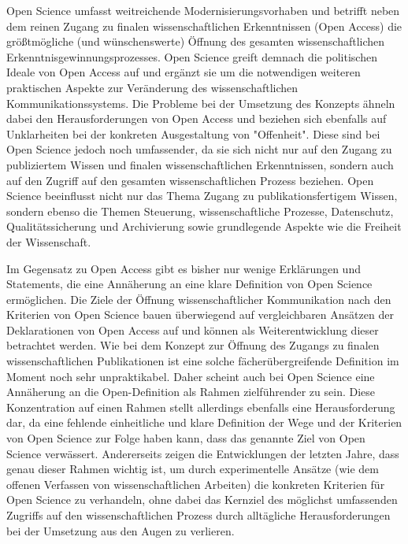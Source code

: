 Open Science umfasst weitreichende Modernisierungsvorhaben und betrifft neben dem reinen Zugang zu finalen wissenschaftlichen Erkenntnissen (Open Access) die größtmögliche (und wünschenswerte) Öffnung des gesamten wissenschaftlichen Erkenntnisgewinnungsprozesses. Open Science greift demnach die politischen Ideale von Open Access auf und ergänzt sie um die notwendigen weiteren praktischen Aspekte zur Veränderung des wissenschaftlichen Kommunikationssystems. Die Probleme bei der Umsetzung des Konzepts ähneln dabei den Herausforderungen von Open Access und beziehen sich ebenfalls auf Unklarheiten bei der konkreten Ausgestaltung von "Offenheit". Diese sind bei Open Science jedoch noch umfassender, da sie sich nicht nur auf den Zugang zu publiziertem Wissen und finalen wissenschaftlichen Erkenntnissen, sondern auch auf den Zugriff auf den gesamten wissenschaftlichen Prozess beziehen. Open Science beeinflusst nicht nur das Thema Zugang zu publikationsfertigem Wissen, sondern ebenso die Themen Steuerung, wissenschaftliche Prozesse, Datenschutz, Qualitätssicherung und Archivierung sowie grundlegende Aspekte wie die Freiheit der Wissenschaft.

Im Gegensatz zu Open Access gibt es bisher nur wenige Erklärungen und Statements, die eine Annäherung an eine klare Definition von Open Science ermöglichen. Die Ziele der Öffnung wissenschaftlicher Kommunikation nach den Kriterien von Open Science bauen überwiegend auf vergleichbaren Ansätzen der Deklarationen von Open Access auf und können als Weiterentwicklung dieser betrachtet werden. Wie bei dem Konzept zur Öffnung des Zugangs zu finalen wissenschaftlichen Publikationen ist eine solche fächerübergreifende Definition im Moment noch sehr unpraktikabel. Daher scheint auch bei Open Science eine Annäherung an die Open-Definition als Rahmen zielführender zu sein. Diese Konzentration auf einen Rahmen stellt allerdings ebenfalls eine Herausforderung dar, da eine fehlende einheitliche und klare Definition der Wege und der Kriterien von Open Science zur Folge haben kann, dass das genannte Ziel von Open Science verwässert. Andererseits zeigen die Entwicklungen der letzten Jahre, dass genau dieser Rahmen wichtig ist, um durch experimentelle Ansätze (wie dem offenen Verfassen von wissenschaftlichen Arbeiten) die konkreten Kriterien für Open Science zu verhandeln, ohne dabei das Kernziel des möglichst umfassenden Zugriffs auf den wissenschaftlichen Prozess durch alltägliche Herausforderungen bei der Umsetzung aus den Augen zu verlieren.

